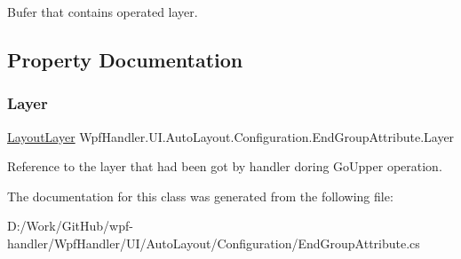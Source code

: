Bufer that contains operated layer. 



\subsection{Property Documentation}
\mbox{\label{class_wpf_handler_1_1_u_i_1_1_auto_layout_1_1_configuration_1_1_end_group_attribute_aa49aeed9019ee998b6b85920251ce7c2}} 
\subsubsection{\texorpdfstring{Layer}{Layer}}
{\footnotesize\ttfamily \mbox{\hyperlink{class_wpf_handler_1_1_u_i_1_1_auto_layout_1_1_layout_layer}{Layout\+Layer}} Wpf\+Handler.\+U\+I.\+Auto\+Layout.\+Configuration.\+End\+Group\+Attribute.\+Layer\hspace{0.3cm}{\ttfamily [get]}}



Reference to the layer that had been got by handler doring Go\+Upper operation. 



The documentation for this class was generated from the following file\+:\begin{DoxyCompactItemize}
\item 
D\+:/\+Work/\+Git\+Hub/wpf-\/handler/\+Wpf\+Handler/\+U\+I/\+Auto\+Layout/\+Configuration/End\+Group\+Attribute.\+cs\end{DoxyCompactItemize}
